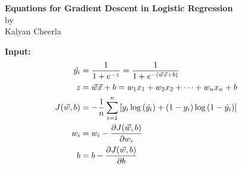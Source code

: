 \documentclass[11pt]{article}
\begin{document}
\newpage

\begin{center}
    {\LARGE \bf Equations for Gradient Descent in Logistic Regression}\\
    by\\
    {\large Kalyan Cheerla}
\end{center}

\textbf{Input:}
\begin{align}
    \setcounter{equation}{0}
    \hat{y_i} &= \frac{1}{1+e^{-z}} = \frac{1}{1+e^{-(\vec{w}\vec{x}+b)}} \\
    z &= \vec{w}\vec{x}+b = w_1 x_1 + w_2 x_2 +\dots+ w_n x_n + b \notag\\
    J(\vec{w}, b) &= -\frac{1}{n} \displaystyle\sum_{i=1}^{n} \left[ y_i \log{(\hat{y_i})} + (1 - y_i) \log{(1 - \hat{y_i})} \right] \\
    w_i &= w_i - \frac{\partial{J(\vec{w}, b)}}{\partial{w_i}} \\
    b &= b - \frac{\partial{J(\vec{w}, b)}}{\partial{b}} \notag &&
\end{align}
\end{document}
